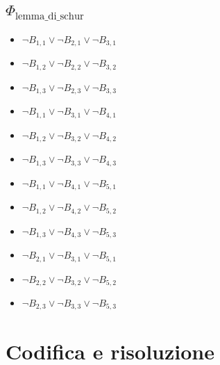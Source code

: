 \documentclass[a4paper, 12pt]{article}
\begin{document}
\begin{itemize}[label={}]
\subsection{$\Phi_{\text{lemma\_di\_schur}}$}
\begin{itemize}[label={}]
\item $\lnot B_{1,1} \lor \lnot B_{2,1} \lor \lnot B_{3,1}$
\item $\lnot B_{1,2} \lor \lnot B_{2,2} \lor \lnot B_{3,2}$
\item $\lnot B_{1,3} \lor \lnot B_{2,3} \lor \lnot B_{3,3}$
\item $\lnot B_{1,1} \lor \lnot B_{3,1} \lor \lnot B_{4,1}$
\item $\lnot B_{1,2} \lor \lnot B_{3,2} \lor \lnot B_{4,2}$
\item $\lnot B_{1,3} \lor \lnot B_{3,3} \lor \lnot B_{4,3}$
\item $\lnot B_{1,1} \lor \lnot B_{4,1} \lor \lnot B_{5,1}$
\item $\lnot B_{1,2} \lor \lnot B_{4,2} \lor \lnot B_{5,2}$
\item $\lnot B_{1,3} \lor \lnot B_{4,3} \lor \lnot B_{5,3}$
\item $\lnot B_{2,1} \lor \lnot B_{3,1} \lor \lnot B_{5,1}$
\item $\lnot B_{2,2} \lor \lnot B_{3,2} \lor \lnot B_{5,2}$
\item $\lnot B_{2,3} \lor \lnot B_{3,3} \lor \lnot B_{5,3}$
\end{itemize}

\section{Codifica e risoluzione}
\end{itemize}
\end{document}
